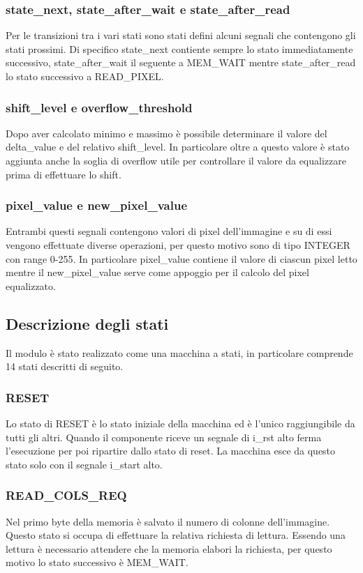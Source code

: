 \documentclass{article}
\begin{document}
\subsubsection{state\_next, state\_after\_wait e state\_after\_read}
Per le transizioni tra i vari stati sono stati defini alcuni segnali che contengono gli stati prossimi. Di specifico state\_next contiente sempre lo stato immediatamente successivo, state\_after\_wait il seguente a MEM\_WAIT mentre state\_after\_read lo stato successivo a READ\_PIXEL.

\subsubsection{shift\_level e overflow\_threshold}
Dopo aver calcolato minimo e massimo è possibile determinare il valore del delta\_value e del relativo shift\_level. In particolare oltre a questo valore è stato aggiunta anche la soglia di overflow utile per controllare il valore da equalizzare prima di effettuare lo shift.


\subsubsection{pixel\_value e new\_pixel\_value}
Entrambi questi segnali contengono valori di pixel dell'immagine e su di essi vengono effettuate diverse operazioni, per questo motivo sono di tipo INTEGER con range 0-255. In particolare pixel\_value contiene il valore di ciascun pixel letto mentre il new\_pixel\_value serve come appoggio per il calcolo del pixel equalizzato.

\pagebreak

\subsection{Descrizione degli stati}
Il modulo è stato realizzato come una macchina a stati, in particolare comprende 14 stati descritti di seguito.

\subsubsection{RESET}
Lo stato di RESET è lo stato iniziale della macchina ed è l'unico raggiungibile da tutti gli altri. Quando il componente riceve un segnale di i\_rst alto ferma l'esecuzione per poi ripartire dallo stato di reset. La macchina esce da questo stato solo con il segnale i\_start alto.

\subsubsection{READ\_COLS\_REQ}
Nel primo byte della memoria è salvato il numero di colonne dell'immagine. Questo stato si occupa di effettuare la relativa richiesta di lettura. Essendo una lettura è necessario attendere che la memoria elabori la richiesta, per questo motivo lo stato successivo è MEM\_WAIT.
\end{document}
